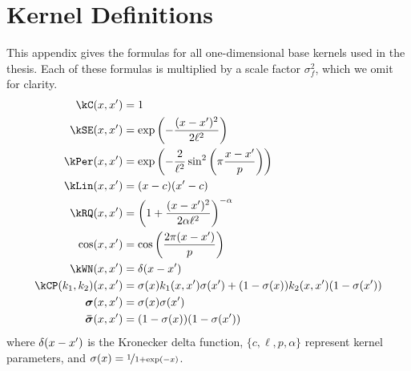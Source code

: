 \chapter{Kernel Definitions}
\label{sec:kernel-definitions}

\newcommand{\scalefactor}{}

This appendix gives the formulas for all one-dimensional base kernels used in the thesis.
Each of these formulas is multiplied by a scale factor $\sigma_f^2$, which we omit for clarity.
%
\begin{align}
\kC(\inputVar, \inputVar') & = \scalefactor 1 \\
\kSE(\inputVar, \inputVar') & = \scalefactor \exp\left(-\frac{(\inputVar - \inputVar')^2}{2\ell^2}\right)  \label{eq:appendix-se}\\
\kPer(x, x') & = \exp\left(-\frac{2}{\ell^2} \sin^2 \left( \pi \frac{\inputVar - \inputVar'}{p} \right)\right) \label{eq:appendix-periodic}\\
\kLin(\inputVar, \inputVar') & = \scalefactor (\inputVar - c)(\inputVar' - c)  \label{eq:appendix-lin} \\
\kRQ(x, x') & = \scalefactor \left( 1 + \frac{(\inputVar - \inputVar')^2}{2\alpha\ell^2}\right)^{-\alpha}  \label{eq:appendix-rq}\\
\cos(x, x') & = \scalefactor \cos\left(\frac{2 \pi (x - x')}{p}\right) \label{eq:appendix-cos} \\
\kWN(\inputVar, \inputVar') & = \scalefactor \delta(\inputVar - \inputVar') \label{eq:appendix-wn}\\
\kCP(\kernel_1, \kernel_2)(x, x') & = \scalefactor \sigma(x) k_1(x,x')\sigma(x') + (1-\sigma(x)) k_2(x,x')(1-\sigma(x')) \\
\boldsymbol\sigma(\inputVar, \inputVar') & = \scalefactor \sigma(x)\sigma(x') \\
\boldsymbol{\bar\sigma}(\inputVar, \inputVar') & = \scalefactor (1-\sigma(x))(1-\sigma(x'))
\end{align}
%
where $\delta(x - x')$ is the Kronecker delta function, $\{c,\ell,p,\alpha\}$ represent kernel parameters, and ${\sigma(x) = \nicefrac{1}{1 + \exp(-x)}}$.

